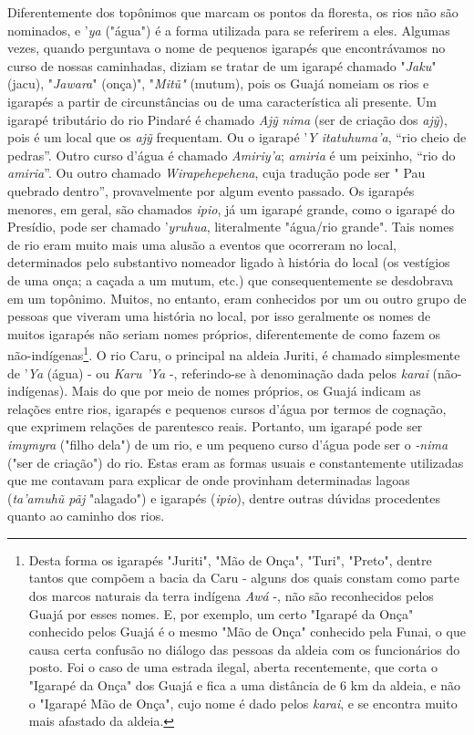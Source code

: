 Diferentemente dos topônimos que marcam os pontos da floresta, os rios
não são nominados, e '\emph{ya} ("água") é a forma utilizada para se
referirem a eles. Algumas vezes, quando perguntava o nome de pequenos
igarapés que encontrávamos no curso de nossas caminhadas, diziam se
tratar de um igarapé chamado "\emph{Jaku}" (jacu), "\emph{Jawara}"
(onça)", "\emph{Mitũ"} (mutum), pois os Guajá nomeiam os rios e igarapés
a partir de circunstâncias ou de uma característica ali presente. Um
igarapé tributário do rio Pindaré é chamado \emph{Ajỹ} \emph{nima} (ser
de criação dos \emph{ajỹ}), pois é um local que os \emph{ajỹ}
frequentam. Ou o igarapé '\emph{Y itatuhuma'a}, ``rio cheio de pedras''.
Outro curso d'água é chamado \emph{Amiriy'a}; \emph{amiria} é um
peixinho, ``rio do \emph{amiria}''. Ou outro chamado
\emph{Wirapehepehena}, cuja tradução pode ser " Pau quebrado dentro'',
provavelmente por algum evento passado. Os igarapés menores, em geral,
são chamados \emph{ipio}, já um igarapé grande, como o igarapé do
Presídio, pode ser chamado '\emph{yruhua}, literalmente "água/rio
grande". Tais nomes de rio eram muito mais uma alusão a eventos que
ocorreram no local, determinados pelo substantivo nomeador ligado à
história do local (os vestígios de uma onça; a caçada a um mutum, etc.)
que consequentemente se desdobrava em um topônimo. Muitos, no entanto,
eram conhecidos por um ou outro grupo de pessoas que viveram uma
história no local, por isso geralmente os nomes de muitos igarapés não
seriam nomes próprios, diferentemente de como fazem os
não-indígenas\footnote{Desta forma os igarapés "Juriti", "Mão de Onça",
  "Turi", "Preto", dentre tantos que compõem a bacia da Caru - alguns
  dos quais constam como parte dos marcos naturais da terra indígena
  \emph{Awá} -, não são reconhecidos pelos Guajá por esses nomes. E, por
  exemplo, um certo "Igarapé da Onça" conhecido pelos Guajá é o mesmo
  "Mão de Onça" conhecido pela Funai, o que causa certa confusão no
  diálogo das pessoas da aldeia com os funcionários do posto. Foi o caso
  de uma estrada ilegal, aberta recentemente, que corta o "Igarapé da
  Onça" dos Guajá e fica a uma distância de 6 km da aldeia, e não o
  "Igarapé Mão de Onça", cujo nome é dado pelos \emph{karai}, e se
  encontra muito mais afastado da aldeia.}. O rio Caru, o principal na
aldeia Juriti, é chamado simplesmente de '\emph{Ya} (água) - ou
\emph{Karu 'Ya} -, referindo-se à denominação dada pelos \emph{karai}
(não-indígenas). Mais do que por meio de nomes próprios, os Guajá
indicam as relações entre rios, igarapés e pequenos cursos d'água por
termos de cognação, que exprimem relações de parentesco reais. Portanto,
um igarapé pode ser \emph{imymyra} ("filho dela") de um rio, e um
pequeno curso d'água pode ser o \emph{-nima} ("ser de criação") do rio.
Estas eram as formas usuais e constantemente utilizadas que me contavam
para explicar de onde provinham determinadas lagoas (\emph{ta'amuhũ pãj}
"alagado") e igarapés (\emph{ipio}), dentre outras dúvidas procedentes
quanto ao caminho dos rios.

